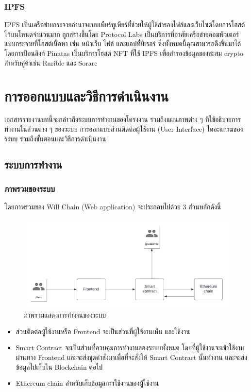 \documentclass[12pt,oneside,openright,a4paper]{cpe-thai-project}
\begin{document}
\subsection{IPFS \cite{ipfs}}
\tab IPFS เป็นเครือข่ายกระจายอำนาจแบบเพียร์ทูเพียร์ที่ช่วยให้ผู้ใช้สำรองไฟล์และเว็บไซต์โดยการโฮสต์ไว้บนโหนดจำนวนมาก ถูกสร้างขึ้นโดย Protocol Labs เป็นบริการที่อาศัยเครือข่ายคอมพิวเตอร์แบบกระจายที่โฮสต์เนื้อหา เช่น หน้าเว็บ ไฟล์ และแอปที่มิเรอร์ ซึ่งทั้งหมดนี้คุณสามารถดึงขึ้นมาได้โดยการป้อนลิงก์
Pinatas เป็นบริการโฮสต์ NFT ที่ใช้ IPFS เพื่อสำรองข้อมูลของสะสม crypto สำหรับคู่ค้าเช่น Rarible และ Sorare


\chapter{การออกแบบและวิธีการดำเนินงาน}
\tab เอกสารรายงานบทนี้จะกล่าวถึงระบบการทำงานของโครงงาน รวมถึงแผนภาพต่าง ๆ ที่ใช้อธิบายการทำงานในส่วนต่าง ๆ ของระบบ การออกแบบส่วนติดต่อผู้ใช้งาน (User Interface) ไดอะแกรมของระบบ รวมถึงขั้นตอนและวิธีการดำเนินงาน
\section{ระบบการทำงาน}
\subsection{ภาพรวมของระบบ}
\tab โดยภาพรวมของ Will Chain (Web application) จะประกอบไปด้วย 3 ส่วนหลักดังนี้
	\begin{figure}[h]
		\centering
		\includegraphics[scale=0.8]{Overall_system}
		\caption{ภาพรวมแสดงการทำงานของระบบ}
	\end{figure}
	\begin{itemize}[leftmargin=0pt,itemindent=2.5cm]
		\item ส่วนติดต่อผู้ใช้งานหรือ Frontend จะเป็นส่วนที่ผู้ใช้งานเห็น และใช้งาน
		\item Smart Contract จะเป็นส่วนที่ควบคุมการทำงานของระบบทั้งหมด โดยที่ผู้ใช้งานจะเข้าใช้งานผ่านทาง Frontend และจะส่งชุดคำสั่งมาเพื่อที่จะสั่งให้ Smart Contract นั้นทำงาน และจะส่งข้อมูลไปเก็บใน Blockchain ต่อไป
		\item Ethereum chain สำหรับเก็บข้อมูลการใช้งานของผู้ใช้งาน
	\end{itemize}
\end{document}
